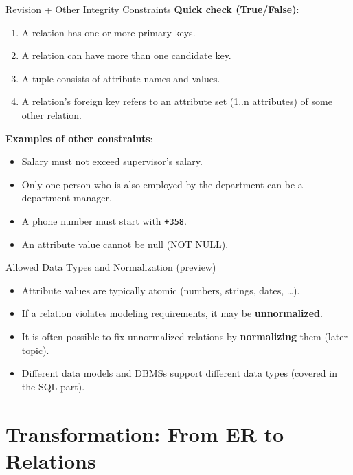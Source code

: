 \documentclass[10pt,aspectratio=169]{beamer}
\begin{document}
\begin{frame}{Revision + Other Integrity Constraints}
\small
\textbf{Quick check (True/False)}:
\begin{enumerate}
  \item A relation has one or more primary keys.
  \item A relation can have more than one candidate key.
  \item A tuple consists of attribute names and values.
  \item A relation's foreign key refers to an attribute set (1..n attributes) of some other relation.
\end{enumerate}

\vspace{1mm}
\textbf{Examples of other constraints}:
\begin{itemize}
  \item Salary must not exceed supervisor's salary.
  \item Only one person who is also employed by the department can be a department manager.
  \item A phone number must start with \texttt{+358}.
  \item An attribute value cannot be null (NOT NULL).
\end{itemize}
\end{frame}

\begin{frame}{Allowed Data Types and Normalization (preview)}
\small
\begin{itemize}
  \item Attribute values are typically atomic (numbers, strings, dates, \dots).
  \item If a relation violates modeling requirements, it may be \textbf{unnormalized}.
  \item It is often possible to fix unnormalized relations by \textbf{normalizing} them (later topic).
  \item Different data models and DBMSs support different data types (covered in the SQL part).
\end{itemize}
\end{frame}

\section{Transformation: From ER to Relations}
\end{document}
